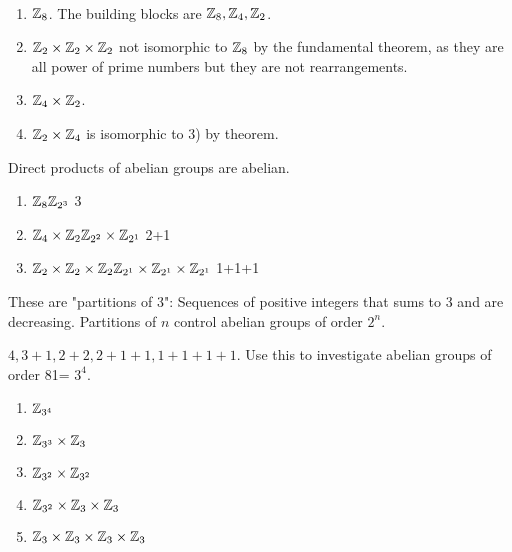 \documentclass[class=article,crop=false]{standalone}
\begin{document}
\begin{eg}
~\begin{enumerate}[label=\arabic*)]
	\item $ \mathbb{Z}_8$. The building blocks are $ \mathbb{Z}_8, \mathbb{Z}_4, \mathbb{Z}_2$.
	\item $ \mathbb{Z}_2 \times \mathbb{Z}_2 \times \mathbb{Z}_2$ not isomorphic to $ \mathbb{Z}_8$ by the fundamental theorem, as they are all power of prime numbers but they are not rearrangements. 
	\item $ \mathbb{Z}_4 \times \mathbb{Z}_2$.
	\item $ \mathbb{Z}_2 \times \mathbb{Z}_4$ is isomorphic to 3) by theorem.
\end{enumerate}

\begin{claim}[]
Direct products of abelian groups are abelian.
\end{claim}

\begin{enumerate}[label=\arabic*)]
	\item $ \mathbb{Z}_8 \mathbb{Z}_{2^3}$ 3
	\item $ \mathbb{Z}_4 \times \mathbb{Z}_2 \mathbb{Z}_{2^2} \times \mathbb{Z}_{2^1}$ 2+1
	\item $ \mathbb{Z}_2 \times \mathbb{Z}_2\times \mathbb{Z}_2 \mathbb{Z}_{2^1} \times \mathbb{Z}_{2^1} \times \mathbb{Z}_{2^1}$ 1+1+1
\end{enumerate}
These are "partitions of 3": Sequences of positive integers that sums to 3 and are decreasing. Partitions of $ n$ control abelian groups of order  $ 2^{n}$.
\end{eg}

\begin{eg}[partition of 4]
$ 4, 3+1,2+2,2+1+1,1+1+1+1$. Use this to investigate abelian groups of order 81= $ 3^4$. 
\begin{enumerate}[label=\arabic*)]
	\item $ \mathbb{Z}_{3^{4}}$ 
	\item $ \mathbb{Z}_{3^3} \times \mathbb{Z}_{3}$ 
	\item $ \mathbb{Z}_{3^2} \times \mathbb{Z}_{3^2}$ 
	\item $ \mathbb{Z}_{3^2}\times \mathbb{Z}_{3} \times \mathbb{Z}_{3}$ 
	\item $ \mathbb{Z}_{3} \times \mathbb{Z}_3 \times \mathbb{Z}_3 \times \mathbb{Z}_3$
\end{enumerate}
\end{eg}
\end{document}
